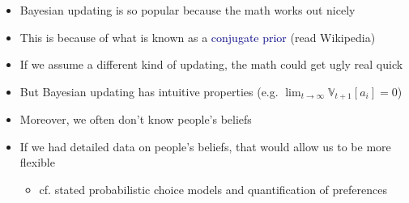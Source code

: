 \documentclass[aspectratio=169]{beamer}
\begin{document}
\begin{frame}

\begin{itemize}
\itemsep1.5em
\item<1-> Bayesian updating is so popular because the math works out nicely

\item<2-> This is because of what is known as a \textcolor{navy}{conjugate prior} (read Wikipedia)

\item<3-> If we assume a different kind of updating, the math could get ugly real quick

\item<4-> But Bayesian updating has intuitive properties (e.g. $\lim_{t\rightarrow\infty}\mathbb{V}_{t+1}[a_i] = 0$)

\item<5-> Moreover, we often don't know people's beliefs

\item<6-> If we had detailed data on people's beliefs, that would allow us to be more flexible
\bigskip\par
\begin{itemize}
\itemsep1.5em
\item cf. stated probabilistic choice models and quantification of preferences
\end{itemize}
\end{itemize}

\end{frame}
\end{document}
